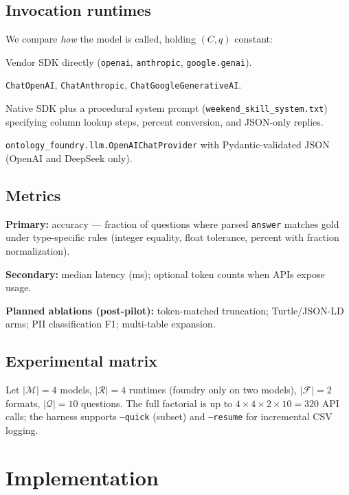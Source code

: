 \documentclass[11pt,a4paper]{article}
\begin{document}
\subsection{Invocation runtimes}
\label{sec:runtimes}
We compare \emph{how} the model is called, holding $(C, q)$ constant:
\begin{description}[leftmargin=2.2cm,style=nextline]
  \item[\textbf{native}] Vendor SDK directly (\texttt{openai}, \texttt{anthropic}, \texttt{google.genai}).
  \item[\textbf{langchain}] \texttt{ChatOpenAI}, \texttt{ChatAnthropic}, \texttt{ChatGoogleGenerativeAI}.
  \item[\textbf{skill}] Native SDK plus a procedural system prompt (\texttt{weekend\_skill\_system.txt}) specifying column lookup steps, percent conversion, and JSON-only replies.
  \item[\textbf{foundry}] \texttt{ontology\_foundry.llm.OpenAIChatProvider} with Pydantic-validated JSON (OpenAI and DeepSeek only).
\end{description}

\subsection{Metrics}
\textbf{Primary:} accuracy --- fraction of questions where parsed \texttt{answer} matches gold under type-specific rules (integer equality, float tolerance, percent with fraction normalization).

\textbf{Secondary:} median latency (ms); optional token counts when APIs expose usage.

\textbf{Planned ablations (post-pilot):} token-matched truncation; Turtle/JSON-LD arms; PII classification F1; multi-table expansion.

\subsection{Experimental matrix}
Let $|\mathcal{M}|=4$ models, $|\mathcal{R}|=4$ runtimes (foundry only on two models), $|\mathcal{F}|=2$ formats, $|\mathcal{Q}|=10$ questions.
The full factorial is up to $4 \times 4 \times 2 \times 10 = 320$ API calls; the harness supports \texttt{--quick} (subset) and \texttt{--resume} for incremental CSV logging.

\section{Implementation}
\label{sec:impl}
\end{document}
